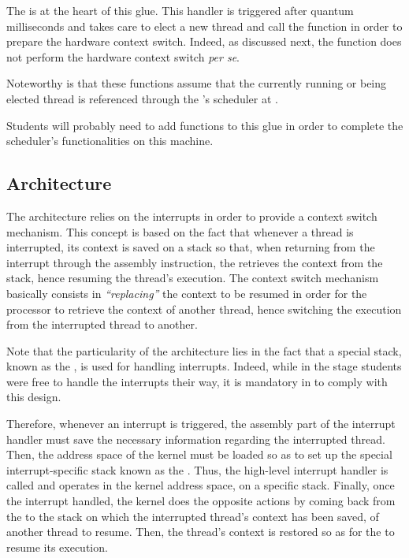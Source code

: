 The  is at the heart of this glue. This
handler is triggered after quantum milliseconds and takes care to elect
a new thread and call the  function
in order to prepare the hardware context switch. Indeed, as discussed
next, the  function does not perform
the hardware context switch \textit{per se}.

Noteworthy is that these functions assume that the currently running or
being elected thread is referenced through the 's scheduler at
.

Students will probably need to add functions to this glue in order to
complete the scheduler's functionalities on this machine.

%
%

\subsection{Architecture}

The  architecture relies on the interrupts in order
to provide a context switch mechanism. This concept is based on the fact
that whenever a thread is interrupted, its context is saved on a stack
so that, when returning from the interrupt through the  assembly
instruction, the  retrieves the context from the stack, hence
resuming the thread's execution. The context switch mechanism basically
consists in \textit{``replacing''} the context to be resumed in order for
the processor to retrieve the context of another thread, hence switching
the execution from the interrupted thread to another.

Note that the particularity of the  architecture lies
in the fact that a special stack, known as the , is used for handling interrupts. Indeed, while in the stage 
students were free to handle the interrupts their way, it is mandatory in
 to comply with this design.

Therefore, whenever an interrupt is triggered, the assembly part of the
interrupt handler must save the necessary information regarding the interrupted
thread. Then, the address space of the kernel must be loaded so as to
set up the special interrupt-specific stack known as the .
Thus, the high-level interrupt handler is called and operates in the
kernel address space, on a specific stack. Finally, once the interrupt
handled, the kernel does the opposite actions by coming back from
the  to the stack on which the interrupted thread's context
has been saved, of another thread to resume. Then, the thread's context
is restored so as for the  to resume its execution.

